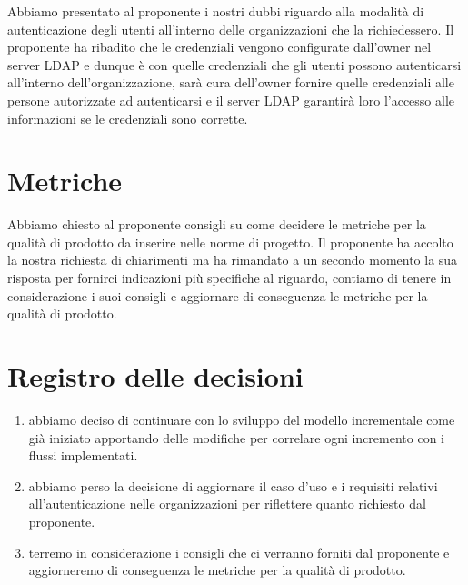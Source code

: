 \documentclass{article}
\begin{document}
Abbiamo presentato al proponente i nostri dubbi riguardo alla modalità di autenticazione degli utenti all'interno delle organizzazioni che la richiedessero. Il proponente ha ribadito che le credenziali vengono configurate dall'owner nel server LDAP e dunque è con quelle credenziali che gli utenti possono autenticarsi all'interno dell'organizzazione, sarà cura dell'owner fornire quelle credenziali alle persone autorizzate ad autenticarsi e il server LDAP garantirà loro l'accesso alle informazioni se le credenziali sono corrette.

\section{Metriche}%
\label{sec:metriche}

Abbiamo chiesto al proponente consigli su come decidere le metriche per la qualità di prodotto da inserire nelle norme di progetto. Il proponente ha accolto la nostra richiesta di chiarimenti ma ha rimandato a un secondo momento la sua risposta per fornirci indicazioni più specifiche al riguardo, contiamo di tenere in considerazione i suoi consigli e aggiornare di conseguenza le metriche per la qualità di prodotto.

\newpage
\section{Registro delle decisioni}%
\label{sec:registro_delle_decisioni}

\begin{enumerate}
  \item abbiamo deciso di continuare con lo sviluppo del modello incrementale come già iniziato apportando delle modifiche per correlare ogni incremento con i flussi implementati.
  \item abbiamo perso la decisione di aggiornare il caso d'uso e i requisiti relativi all'autenticazione nelle organizzazioni per riflettere quanto richiesto dal proponente.
  \item terremo in considerazione i consigli che ci verranno forniti dal proponente e aggiorneremo di conseguenza le metriche per la qualità di prodotto.
\end{enumerate}

\end{document}
